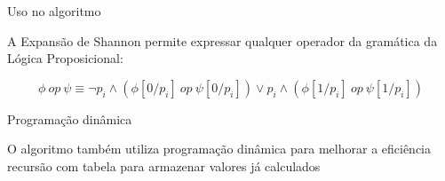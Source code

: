 \expandafter\documentclass\expandafter[table, usenames, svgnames, dvipsnames,14pt, \classopts]{beamer}
\begin{document}
\begin{frame}{Uso no algoritmo }

    \small
    A Expansão de Shannon permite expressar qualquer operador da gramática da Lógica Proposicional:

    \scriptsize
    $$\phi~op~\psi \equiv \lnot{p_i} \land (\phi[0/p_i]~op~\psi[0/p_i]) \lor p_i \land (\phi[1/p_i]~op~\psi[1/p_i])$$
    
    \begin{center}
    \end{center}

\end{frame}

\begin{frame}{Programação dinâmica}

    \begin{outline}
        \1 O algoritmo  também utiliza programação dinâmica para melhorar a eficiência
            \2[-] recursão com tabela para armazenar valores já calculados
    \end{outline}
    
    \begin{center}
    \end{center}    
    
\end{frame}
\end{document}
